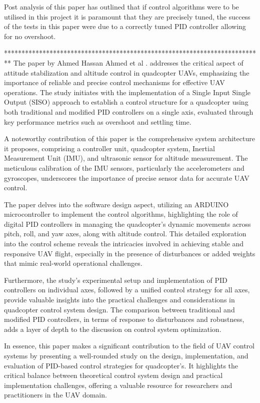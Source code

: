 \documentclass{article}
\begin{document}
Post analysis of this paper has outlined that if control algorithms were to be utilised in this project it is paramount that they are precisely tuned, the success of the tests in this paper were due to a correctly tuned PID controller allowing for no overshoot. 

**************************************************************************
The paper by Ahmed Hassan Ahmed et al \cite{AhmedHassan2016}. addresses the critical aspect of attitude stabilization and altitude control in quadcopter UAVs, emphasizing the importance of reliable and precise control mechanisms for effective UAV operations. The study initiates with the implementation of a Single Input Single Output (SISO) approach to establish a control structure for a quadcopter using both traditional and modified PID controllers on a single axis, evaluated through key performance metrics such as overshoot and settling time.

A noteworthy contribution of this paper is the comprehensive system architecture it proposes, comprising a controller unit, quadcopter system, Inertial Measurement Unit (IMU), and ultrasonic sensor for altitude measurement. The meticulous calibration of the IMU sensors, particularly the accelerometers and gyroscopes, underscores the importance of precise sensor data for accurate UAV control.

The paper delves into the software design aspect, utilizing an ARDUINO microcontroller to implement the control algorithms, highlighting the role of digital PID controllers in managing the quadcopter's dynamic movements across pitch, roll, and yaw axes, along with altitude control. This detailed exploration into the control scheme reveals the intricacies involved in achieving stable and responsive UAV flight, especially in the presence of disturbances or added weights that mimic real-world operational challenges.

Furthermore, the study's experimental setup and implementation of PID controllers on individual axes, followed by a unified control strategy for all axes, provide valuable insights into the practical challenges and considerations in quadcopter control system design. The comparison between traditional and modified PID controllers, in terms of response to disturbances and robustness, adds a layer of depth to the discussion on control system optimization.

In essence, this paper makes a significant contribution to the field of UAV control systems by presenting a well-rounded study on the design, implementation, and evaluation of PID-based control strategies for quadcopter's. It highlights the critical balance between theoretical control system design and practical implementation challenges, offering a valuable resource for researchers and practitioners in the UAV domain.
\end{document}
